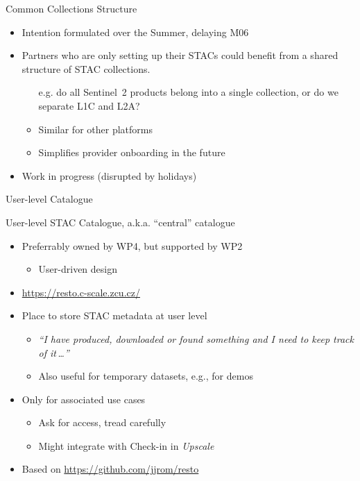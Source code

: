\documentclass[c,aspectratio=169,14pt]{beamer}
\begin{document}
\begin{frame}{Common Collections Structure}
\begin{itemize}
\item Intention formulated over the Summer, delaying \alert{M06}
\item Partners who are only setting up their STACs could benefit from a shared structure of STAC collections.
\begin{itemize}
\item[e.g.] do all Sentinel~2 products belong into a single collection, or do we separate L1C and L2A?
\item Similar for other platforms
\item Simplifies provider onboarding in the future
\end{itemize}
\item Work in progress (disrupted by holidays)
\end{itemize}
\end{frame}

\begin{frame}{User-level Catalogue}

User-level STAC Catalogue, a.k.a. ``central'' catalogue
\begin{itemize}
\item Preferrably owned by WP4, but supported by WP2
\begin{itemize}
\item User-driven design
\end{itemize}
\item \url{https://resto.c-scale.zcu.cz/}
\item Place to store STAC metadata \alert{at user level}
\begin{itemize}
\item \textit{“I have produced, downloaded or found something and I need to keep track of it\,\dots”}
\item Also useful for temporary datasets, e.g., for demos
\end{itemize}
\item Only for associated use cases
\begin{itemize}
\item Ask for access, tread carefully
\item Might integrate with Check-in in \textit{Upscale}
\end{itemize}
\item Based on \url{https://github.com/jjrom/resto}
\end{itemize}
\end{frame}
\end{document}

